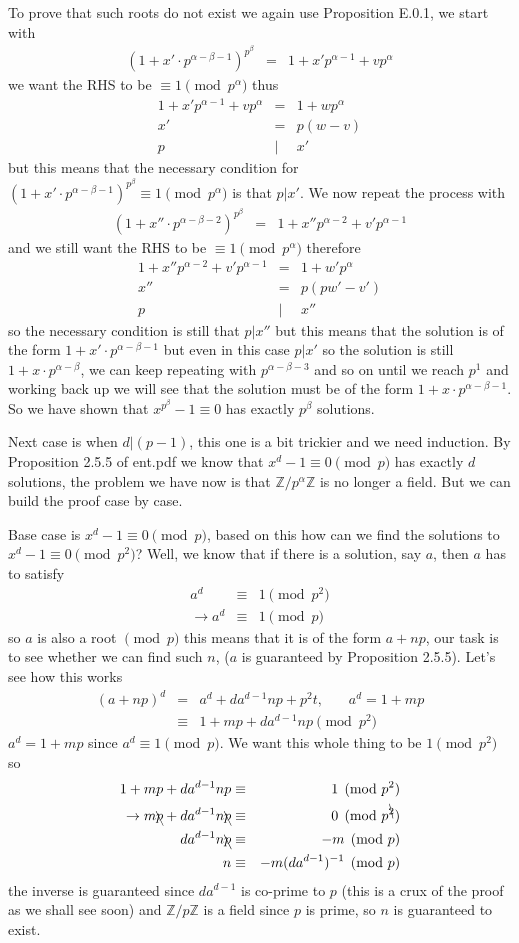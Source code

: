 \documentclass[aps,preprint,preprintnumbers,nofootinbib,showpacs,prd]{revtex4-1}
\newcommand{\nbea}{\begin{eqnarray*}}
\newcommand{\neea}{\end{eqnarray*}}
\begin{document}
To prove that such roots do not exist we again use Proposition E.0.1, we start with
%
\nbea
(1 + x'\cdot p^{\alpha-\beta-1})^{p^\beta} & = & 1 + x'p^{\alpha - 1} + v p^{\alpha}
\neea
%
we want the RHS to be $\equiv 1 \pmod{p^\alpha}$ thus
%
\nbea
1 + x'p^{\alpha - 1} + v p^{\alpha} & = & 1 + w p^\alpha \\
x' & = & p(w - v) \\
p & | & x'
\neea
%
but this means that the necessary condition for $(1 + x'\cdot p^{\alpha-\beta-1})^{p^\beta} \equiv 1 \pmod{p^\alpha}$ is that $p | x'$. We now repeat the process with 
%
\nbea
(1 + x''\cdot p^{\alpha-\beta-2})^{p^\beta} & = & 1 + x''p^{\alpha - 2} + v' p^{\alpha-1}
\neea
%
and we still want the RHS to be $\equiv 1 \pmod{p^\alpha}$ therefore
%
\nbea
1 + x''p^{\alpha - 2} + v' p^{\alpha-1} & = & 1 + w' p^\alpha \\
x'' & = & p(pw' - v') \\
p & | & x''
\neea
%
so the necessary condition is still that $p|x''$ but this means that the solution is of the form $1 + x'\cdot p^{\alpha-\beta-1}$ but even in this case $p|x'$ so the solution is still $1 + x\cdot p^{\alpha-\beta}$, we can keep repeating with $p^{\alpha-\beta-3}$ and so on until we reach $p^{1}$ and working back up we will see that the solution must be of the form $1 + x\cdot p^{\alpha-\beta-1}$. So we have shown that $x^{p^\beta} - 1 \equiv 0$ has exactly $p^\beta$ solutions.

Next case is when $d|(p-1)$, this one is a bit trickier and we need induction. By Proposition 2.5.5 of ent.pdf we know that $x^d - 1\equiv 0 \pmod{p}$ has exactly $d$ solutions, the problem we have now is that $\mathbb{Z}/p^\alpha\mathbb{Z}$ is no longer a field. But we can build the proof case by case.

Base case is $x^d - 1\equiv 0 \pmod{p}$, based on this how can we find the solutions to $x^d - 1\equiv 0 \pmod{p^2}$? Well, we know that if there is a solution, say $a$, then $a$ has to satisfy
%
\nbea
a^d & \equiv & 1 \pmod{p^2} \\
\to a^d & \equiv & 1 \pmod{p}
\neea
%
so $a$ is also a root $\pmod{p}$ this means that it is of the form $a + np$, our task is to see whether we can find such $n$, ($a$ is guaranteed by Proposition 2.5.5). Let's see how this works
%
\nbea
(a + np)^d & = & a^d + da^{d-1}np + p^2 t, ~~~~~~~~ a^d = 1 + mp \\
& \equiv & 1 + mp + da^{d-1}np \pmod{p^2}
\neea
%
$a^d = 1 + mp$ since $a^d \equiv 1 \pmod{p}$. We want this whole thing to be $1 \pmod{p^2}$ so
%
\nbea
1 + mp + da^{d-1}np & \equiv & 1 \pmod{p^2} \\
\to m\bcancel{p} + da^{d-1}n\bcancel{p} & \equiv & 0 \pmod{p^{\bcancel{2}}} \\
da^{d-1}n\bcancel{p} & \equiv & -m \pmod{p} \\
n & \equiv & -m(da^{d-1})^{-1} \pmod{p}
\neea
%
the inverse is guaranteed since $da^{d-1}$ is co-prime to $p$ (this is a crux of the proof as we shall see soon) and $\mathbb{Z}/p\mathbb{Z}$ is a field since $p$ is prime, so $n$ is guaranteed to exist.
\end{document}
